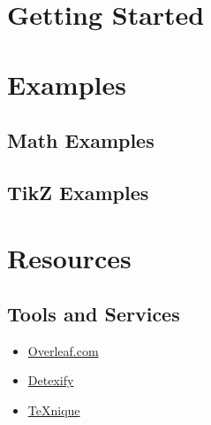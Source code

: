 
\section{Getting Started}
\label{sec:getting_started}

\section{Examples}
\label{sec:examples}

\subsection{Math Examples}
\label{sec:math_examples}

\subsection{TikZ Examples}
\label{sec:tikz_examples}

\section{Resources}
\label{sec:resources}

\subsection{Tools and Services}
\label{sec:tools_and_services}
\begin{itemize}
    \item \href{https://www.overleaf.com/}{Overleaf.com}
    \item \href{https://detexify.kirelabs.org/classify.html}{Detexify}
    \item \href{https://texnique.xyz/}{\TeX{}nique}
\end{itemize}

